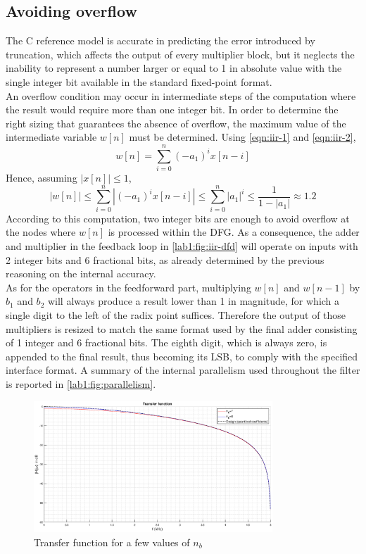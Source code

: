 \subsection{Avoiding overflow}
The C reference model is accurate in predicting the error introduced by truncation, which affects the output of every multiplier block, but it neglects the inability to represent a number larger or equal to 1 in absolute value with the single integer bit available in the standard fixed-point format.\\
An overflow condition may occur in intermediate steps of the computation where the result would require more than one integer bit. In order to determine the right sizing that guarantees the absence of overflow, the maximum value of the intermediate variable $w[n]$ must be determined. Using \autoref{eqn:iir-1} and \autoref{eqn:iir-2},
\begin{equation*}
	w[n] = \sum_{i=0}^{n} (-a_1)^i x[n-i]
\end{equation*}
Hence, assuming $|x[n]|\leq 1$,
\begin{equation*}
	|w[n]|\leq
	\sum_{i=0}^{n} |(-a_1)^i x[n-i]| \leq
	\sum_{i=0}^{n} |a_1|^i \leq
	\frac{1}{1-|a_1|} \approx
	1.2
\end{equation*}
According to this computation, two integer bits are enough to avoid overflow at the nodes where $w[n]$ is processed within the DFG. As a consequence, the adder and multiplier in the feedback loop in \autoref{lab1:fig:iir-dfd} will operate on inputs with 2 integer bits and 6 fractional bits, as already determined by the previous reasoning on the internal accuracy.\\
As for the operators in the feedforward part, multiplying $w[n]$ and $w[n-1]$ by $b_1$ and $b_2$ will always produce a result lower than 1 in magnitude, for which a single digit to the left of the radix point suffices. Therefore the output of those multipliers is resized to match the same format used by the final adder consisting of 1 integer and 6 fractional bits. The eighth digit, which is always zero, is appended to the final result, thus becoming its LSB, to comply with the specified interface format. A summary of the internal parallelism used throughout the filter is reported in \autoref{lab1:fig:parallelism}.
\begin{figure}[htbp]
	\center
	\includegraphics[width=0.8\textwidth]{./chapter1/images/tf_comparison.eps}
	\caption{Transfer function for a few values of $n_b$}
	\label{fig:tfcomparison}
\end{figure}
